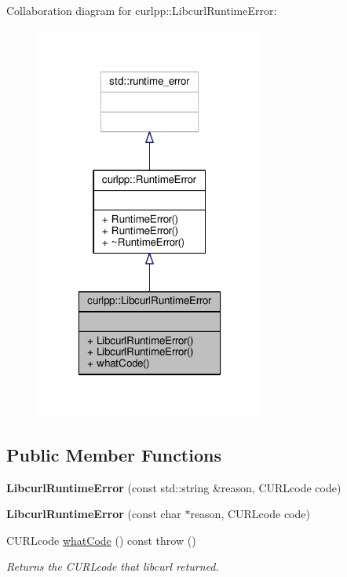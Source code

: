 Collaboration diagram for curlpp\-:\-:Libcurl\-Runtime\-Error\-:\nopagebreak
\begin{figure}[H]
\begin{center}
\leavevmode
\includegraphics[width=214pt]{classcurlpp_1_1LibcurlRuntimeError__coll__graph}
\end{center}
\end{figure}
\subsection*{Public Member Functions}
\begin{DoxyCompactItemize}
\item 
\hypertarget{classcurlpp_1_1LibcurlRuntimeError_ac12552bff88ba246f7f2955d38111195}{{\bfseries Libcurl\-Runtime\-Error} (const std\-::string \&reason, C\-U\-R\-Lcode code)}\label{classcurlpp_1_1LibcurlRuntimeError_ac12552bff88ba246f7f2955d38111195}

\item 
\hypertarget{classcurlpp_1_1LibcurlRuntimeError_ab69096e7d31046d04225694c6e2a8a43}{{\bfseries Libcurl\-Runtime\-Error} (const char $\ast$reason, C\-U\-R\-Lcode code)}\label{classcurlpp_1_1LibcurlRuntimeError_ab69096e7d31046d04225694c6e2a8a43}

\item 
\hypertarget{classcurlpp_1_1LibcurlRuntimeError_aa101aee12fe88d1a36ce37fdbd297da0}{C\-U\-R\-Lcode \hyperlink{classcurlpp_1_1LibcurlRuntimeError_aa101aee12fe88d1a36ce37fdbd297da0}{what\-Code} () const   throw ()}\label{classcurlpp_1_1LibcurlRuntimeError_aa101aee12fe88d1a36ce37fdbd297da0}

\begin{DoxyCompactList}\small\item\em Returns the C\-U\-R\-Lcode that libcurl returned. \end{DoxyCompactList}\end{DoxyCompactItemize}


